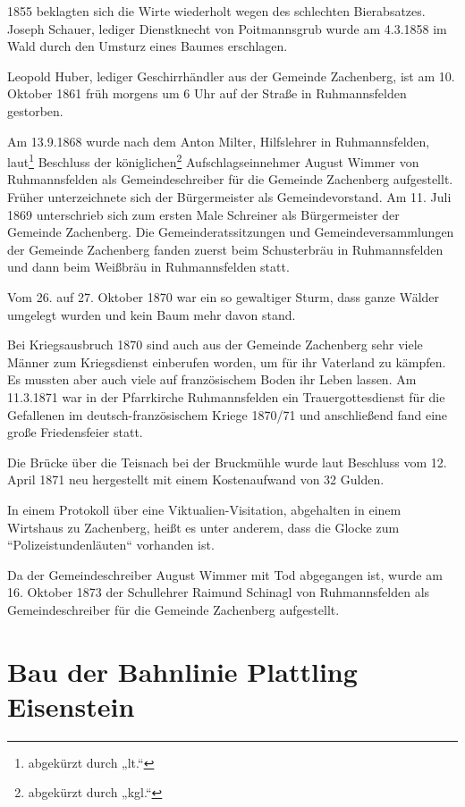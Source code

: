 \documentclass[12pt,a4pager,draft]{book}
\begin{document}
1855 beklagten sich die Wirte wiederholt wegen des schlechten Bierabsatzes.
Joseph Schauer, lediger Dienstknecht von Poitmannsgrub wurde am 4.3.1858 im Wald
durch den Umsturz eines Baumes erschlagen.

Leopold Huber, lediger Geschirrhändler aus der Gemeinde Zachenberg, ist am 10.
Oktober 1861 früh morgens um 6 Uhr auf der Straße in Ruhmannsfelden gestorben.

Am 13.9.1868 wurde nach dem Anton Milter, Hilfslehrer in Ruhmannsfelden,
laut\footnote{abgekürzt durch „lt.“} Beschluss der
königlichen\footnote{abgekürzt durch „kgl.“} Aufschlagseinnehmer August Wimmer
von Ruhmannsfelden als Gemeindeschreiber für die Gemeinde Zachenberg
aufgestellt. Früher unterzeichnete sich der Bürgermeister als Gemeindevorstand.
Am 11. Juli 1869 unterschrieb sich zum ersten Male Schreiner als Bürgermeister
der Gemeinde Zachenberg. Die Gemeinderatssitzungen und Gemeindeversammlungen der
Gemeinde Zachenberg fanden zuerst beim Schusterbräu in Ruhmannsfelden und dann
beim Weißbräu in Ruhmannsfelden statt.

Vom 26. auf 27. Oktober 1870 war ein so gewaltiger Sturm, dass ganze Wälder
umgelegt wurden und kein Baum mehr davon stand.

Bei Kriegsausbruch 1870 sind auch aus der Gemeinde Zachenberg sehr viele Männer
zum Kriegsdienst einberufen worden, um für ihr Vaterland zu kämpfen. Es mussten
aber auch viele auf französischem Boden ihr Leben lassen. Am 11.3.1871 war in
der Pfarrkirche Ruhmannsfelden ein Trauergottesdienst für die Gefallenen im
deutsch-französischem Kriege 1870/71 und anschließend fand eine große
Friedensfeier statt.

Die Brücke über die Teisnach bei der Bruckmühle wurde laut Beschluss vom 12.
April 1871 neu hergestellt mit einem Kostenaufwand von 32 Gulden.

In einem Protokoll über eine Viktualien-Visitation, abgehalten in einem
Wirtshaus zu Zachenberg, heißt es unter anderem, dass die Glocke zum
“Polizeistundenläuten“ vorhanden ist.

Da der Gemeindeschreiber August Wimmer mit Tod abgegangen ist, wurde am 16.
Oktober 1873 der Schullehrer Raimund Schinagl von Ruhmannsfelden als
Gemeindeschreiber für die Gemeinde Zachenberg aufgestellt.

\section{Bau der Bahnlinie Plattling Eisenstein}
\end{document}
